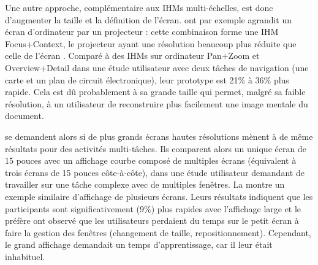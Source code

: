 Une autre approche, complémentaire aux IHMs multi-échelles, est donc d'augmenter la taille et la définition de l'écran. \cite{Baudisch2002} ont par exemple agrandit un écran d'ordinateur par un projecteur : cette combinaison forme une IHM Focus+Context, le projecteur ayant une résolution beaucoup plus réduite que celle de l'écran . Comparé à des IHMs sur ordinateur Pan+Zoom et Overview+Detail dans une étude utilisateur avec deux tâches de navigation (une carte et un plan de circuit électronique), leur prototype est 21\% à 36\% plus rapide. Cela est dû probablement à sa grande taille qui permet, malgré sa faible résolution, à un utilisateur de reconstruire plus facilement une image mentale du document.



\cite{Czerwinski2003} se demandent alors si de plus grands écrans hautes résolutions mènent à de même résultats pour des activités multi-tâches. Ils comparent alors un unique écran de 15 pouces avec un affichage courbe composé de multiples écrans (équivalent à trois écrans de 15 pouces côte-à-côte), dans une étude utilisateur demandant de travailler sur une tâche complexe avec de multiples fenêtres. La  montre un exemple similaire d'affichage de plusieurs écrans. Leurs résultats indiquent que les participants sont significativement (9\%) plus rapides avec l'affichage large et le préfère \citeauthor{Czerwinski2003} ont observé que les utilisateurs perdaient du temps sur le petit écran à faire la gestion des fenêtres (changement de taille, repositionnement). Cependant, le grand affichage demandait un temps d'apprentissage, car il leur était inhabituel.


